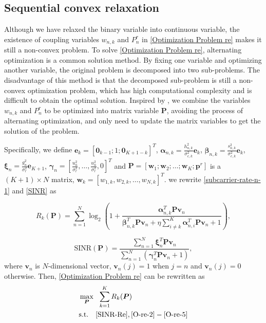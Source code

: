 \documentclass[a4paper,journal,10pt]{IEEEtran}
\begin{document}
\subsection{Sequential convex relaxation}
Although we have relaxed the binary variable into continuous variable, the existence of coupling variables $w_{n,k}$ and $P^r_n$ in \eqref{Optimization Problem re} makes it still a non-convex problem. 
To solve \eqref{Optimization Problem re}, alternating optimization is a common solution method. By fixing one variable and optimizing another variable, the original problem is decomposed into two sub-problems. The disadvantage of this method is that the decomposed sub-problem is still a non-convex optimization problem, which has high computational complexity and is difficult to obtain the optimal solution. Inspired by \cite{WangPowerAllocation}, we combine the variables $w_{n,k}$ and $P^r_n$ to be optimized into matrix variable $\bm{P}$, avoiding the process of alternating optimization, and only need to update the matrix variables to get the solution of the problem.

Specifically, we define $\bm{e}_k =[\bm{0}_{k-1}; 1; \bm{0}_{K+1-k}]^T$, $\bm{\alpha}_{n,k}=\frac{h_{n,k}^2}{\sigma_{c,k}^2}\bm{e}_k$, $\bm{\beta}_{n,k}=\frac{s_{n,k}^2}{\sigma_{c,k}^2}\bm{e}_k$, $\bm{\xi}_n = \frac{g_n^2}{\sigma_r^2}\bm{e}_{K+1}$, $\bm{\gamma}_{n}=[\frac{u_n^2}{\sigma_r^2},\dots,\frac{u_n^2}{\sigma_r^2}, 0]^T$ and $\bm{P} = [\bm{w}_1;\bm{w}_2;\dots;\bm{w}_K;\bm{p}^r]$ is a $(K+1)\times N$ matrix, $\bm{w}_k =[w_{1,k},w_{2,k},\dots,w_{N,k}]^T$. we rewrite \eqref{subcarrier-rate-n-1} and \eqref{SINR} as
\setcounter{equation}{17}
\begin{small}
    \begin{equation}\label{R_k}	R_k(\bm{P})\!=\!\!\sum_{n=1}^{N}\log_2\!\left(\!1\!+\!\frac{\bm{\alpha}_{n,k}^T\bm{P}\bm{v}_n}{\bm{\beta}_{n,k}^T\bm{P}\bm{v}_n\!+\!\eta\!\sum_{i\neq k}^{K}\!\bm{\alpha}_{n,i}^T\bm{P}\bm{v}_n\!+\!1}\!\right),
\end{equation}
\end{small}
\begin{equation}\label{SINR-Re}
	\mathrm{SINR}(\bm{P})= \frac{\sum_{n=1}^{N} \bm{\xi}_n^T\bm{P}\bm{v}_n}{\sum_{n=1}^{N}(\bm{\gamma}_n^T\bm{P}\bm{v}_n+1)},
\end{equation}
where $\bm{v}_n$ is $N$-dimensional vector, $\bm{v}_n(j) = 1$ when $j=n$ and $\bm{v}_n(j) = 0$ otherwise.
Then, \eqref{Optimization Problem re} can be rewritten as
\begin{subequations}\label{OP1}
	\begin{align}
		&\max\limits_{\bm{P}} \ \  \sum_{k=1}^{K} R_k(\bm{P}) \\
		&\mathrm{s.t.}\quad \eqref{SINR-Re}, \eqref{O-re-2}-\eqref{O-re-5} 
	\end{align}
\end{subequations}
\end{document}
